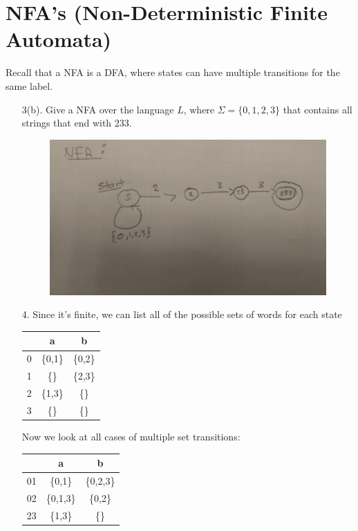\documentclass{report}
\begin{document}
\section{NFA's (Non-Deterministic Finite Automata)}
Recall that a NFA is a DFA, where states can have multiple transitions for the same label.
\begin{itemize}
\item[3(b).] Give a NFA over the language $L$, where $\Sigma = \{0,1,2,3\}$ that contains all strings that end with 233.
\begin{figure}[ht]
\begin{center}
\includegraphics[scale=0.1]{nfa1.jpg}
\end{center}
\end{figure}
\item[4.] Since it's finite, we can list all of the possible sets of words for each state
\begin{center}
\begin{tabular}{ r || c | c }
& a & b \\ \hline
0 & \{0,1\} & \{0,2\} \\ 
1 & \{\} & \{2,3\} \\ 
2 & \{1,3\} & \{\} \\ 
3 & \{\} & \{\} \\ 
\end{tabular}
\end{center}
Now we look at all cases of multiple set transitions:
\begin{center}
\begin{tabular}{ r || c | c }
& a & b \\ \hline
01 & \{0,1\} & \{0,2,3\} \\ 
02 & \{0,1,3\} & \{0,2\} \\ 
23 & \{1,3\} & \{\} \\ 

\end{tabular}
\end{center}
\end{itemize}
\end{document}
